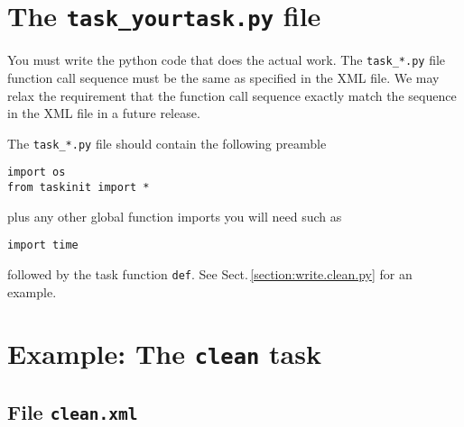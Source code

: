 
\section{The {\tt task\_yourtask.py} file}
\label{section:write.py}

You must write the python code that does the actual work. The
{\tt task\_*.py} file function call sequence must be the same as specified
in the XML file. We may relax the requirement that the function call
sequence exactly match the sequence in the XML file in a future
release.


The {\tt task\_*.py} file should contain the following preamble
\begin{verbatim}
import os
from taskinit import *
\end{verbatim} 

plus any other global function imports you will need such as

\begin{verbatim}
import time
\end{verbatim}
followed by the task function {\tt def}.  See Sect.\,\ref{section:write.clean.py}
for an example.



\section{Example: The {\tt clean} task}
\label{section:write.clean}


\subsection{File {\tt clean.xml} }
\label{section:write.clean.xml}


